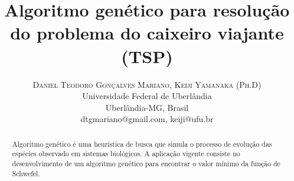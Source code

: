 \documentclass[twoside]{article}
\title{\vspace{-15mm}\fontsize{24pt}{10pt}\selectfont\textbf{Algoritmo genético para resolução do problema do caixeiro viajante (TSP)}} %
\author{
\large
\textsc{Daniel Teodoro Gonçalves Mariano, Keiji Yamanaka (Ph.D)}\\[2mm] %
\normalsize Universidade Federal de Uberlândia\\ \normalsize Uberlândia-MG, Brasil \\ %
\normalsize {dtgmariano@gmail.com, keiji@ufu.br} %
\vspace{-5mm}
}
\date{}
\begin{document}
\maketitle %

\thispagestyle{fancy} %



\begin{abstract}
\noindent
Algoritmo genético é uma heurística de busca que simula o processo de evolução das espécies observado em sistemas biológicos. A aplicação vigente consiste no desenvolvimento de um algoritmo genético para encontrar o valor mínimo da função de Schwefel.
\end{abstract}

\end{document}
